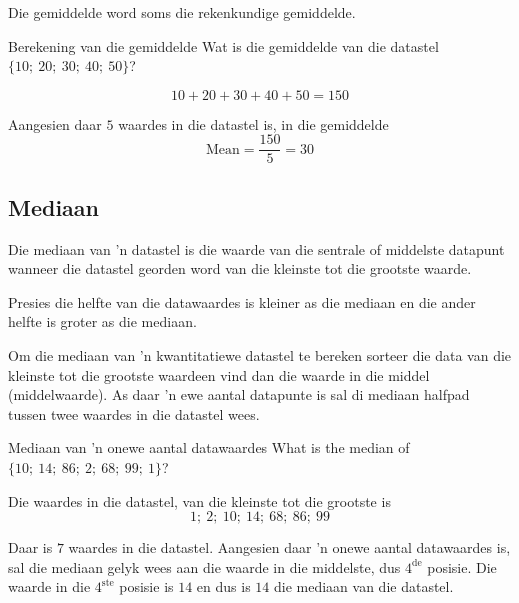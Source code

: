 Die gemiddelde word soms die rekenkundige gemiddelde.
\par
{}

\begin{wex}{Berekening van die gemiddelde}
{Wat is die gemiddelde van die datastel $\{10;\ 20;\ 30;\ 40;\ 50\}$?}
{
  \begin{equation*}
    10 + 20 + 30 + 40 + 50 = 150
  \end{equation*}


  Aangesien daar $5$ waardes in die datastel is, in die gemiddelde
  \begin{equation*}
    \mbox{Mean} = \frac{150}{5} = 30
  \end{equation*}
}
\end{wex}

\subsection{Mediaan}
{Die mediaan van 'n datastel is die waarde van die sentrale of middelste datapunt wanneer die datastel georden word van die kleinste tot die grootste waarde.}

Presies die helfte van die datawaardes is kleiner as die mediaan en die ander helfte is groter as die mediaan.\par

Om die mediaan van 'n kwantitatiewe datastel te bereken sorteer die data van die kleinste tot die grootste waardeen vind dan die waarde in die middel (middelwaarde). As daar 'n ewe aantal datapunte is sal di mediaan halfpad tussen twee waardes in die datastel wees.

\begin{wex}{Mediaan van 'n onewe aantal datawaardes}
{What is the median of $\{10;\ 14;\ 86;\ 2;\ 68;\ 99;\ 1\}$?}
{

  Die waardes in die datastel, van die kleinste tot die grootste is
  \begin{equation*}
    1;\ 2;\ 10;\ 14;\ 68;\ 86;\ 99
  \end{equation*}


  Daar is $7$ waardes in die datastel. Aangesien daar 'n onewe aantal datawaardes is, sal die mediaan gelyk wees aan die waarde in die middelste, dus $4^{\mathrm{de}}$ posisie. Die waarde in die $4^{\mathrm{ste}}$ posisie is $14$ en dus is $14$ die mediaan van die datastel.
}
\end{wex}

